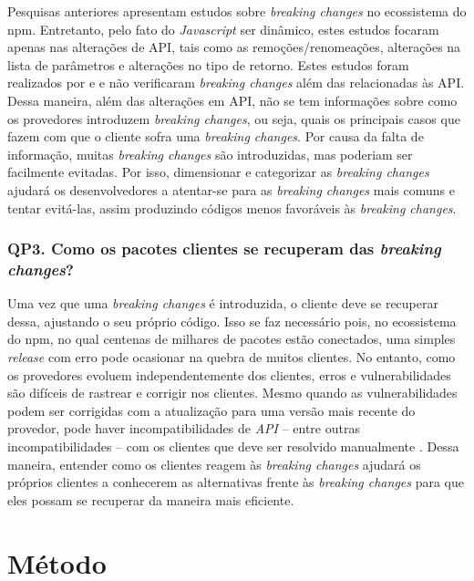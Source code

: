 Pesquisas anteriores apresentam estudos sobre \textit{breaking changes} no ecossistema do \gls{npm}. Entretanto, pelo fato do \textit{Javascript} ser dinâmico, estes estudos focaram apenas nas alterações de \gls{API}, tais como as remoções/renomeações, alterações na lista de parâmetros e alterações no tipo de retorno. Estes estudos foram realizados por   e  e não verificaram \textit{breaking changes} além das relacionadas às \gls{API}. Dessa maneira, além das alterações em \gls{API}, não se tem informações sobre como os provedores introduzem \textit{breaking changes}, ou seja, quais os principais casos que fazem com que o cliente sofra uma \textit{breaking changes}. Por causa da falta de informação, muitas \textit{breaking changes} são introduzidas, mas poderiam ser facilmente evitadas. Por isso, dimensionar e categorizar as \textit{breaking changes} ajudará os desenvolvedores a atentar-se para as \textit{breaking changes} mais comuns e tentar evitá-las, assim produzindo códigos menos favoráveis às \textit{breaking changes}.

\subsubsection{QP3. Como os pacotes clientes se recuperam das \textit{breaking changes}?}

Uma vez que uma \textit{breaking changes} é introduzida, o cliente deve se recuperar dessa, ajustando o seu próprio código. Isso se faz necessário pois, no ecossistema do  \gls{npm}, no qual centenas de milhares de pacotes estão conectados, uma simples \textit{release} com erro pode ocasionar na quebra de muitos clientes. No entanto, como os provedores evoluem independentemente dos clientes, erros e vulnerabilidades são difíceis de rastrear e corrigir nos clientes. Mesmo quando as vulnerabilidades podem ser corrigidas com a atualização para uma versão mais recente do provedor, pode haver incompatibilidades de \textit{API} -- entre outras incompatibilidades -- com os clientes que deve ser resolvido manualmente \cite{Foo:2018:ESC:3236024.3275535}. Dessa maneira, entender como os clientes reagem às \textit{breaking changes} ajudará os próprios clientes a conhecerem as alternativas frente às \textit{breaking changes} para que eles possam se recuperar da maneira mais eficiente.

\section{Método}
\label{sec:metodo}


